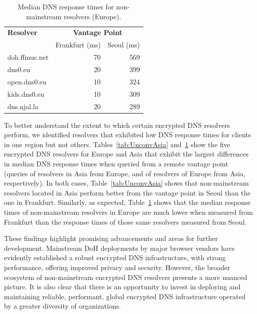 \begin{table}[t!]
\centering
\begin{tabular}{l|rr}
\toprule
\textbf{Resolver} & \multicolumn{2}{c}{\textbf{Vantage Point}} \\
                  & \textrm{Frankfurt (ms)}     & \textrm{Seoul (ms)} \\
\midrule
doh.ffmuc.net                               & 70 & 569                         \\
dns0.eu                        & 20 & 399                         \\
open.dns0.eu         & 10 & 324                         \\
kids.dns0.eu                                 & 10 & 309                         \\
dns.njal.la                        & 20 & 289                         \\
\bottomrule
\end{tabular}
    \caption{Median DNS response times for non-mainstream resolvers (Europe).}
\label{tab:UnconvEur}
\end{table}


To better understand the extent to which certain encrypted DNS resolvers
perform, we identified
resolvers that exhibited low DNS response times for clients in one region
but not others. 
Tables~\ref{tab:UnconvAsia} and~\ref{tab:UnconvEur} show 
the five encrypted DNS resolvers for Europe and Asia that exhibit the 
largest differences in median DNS response times when
queried from a remote vantage point (queries of resolvers in Asia from Europe,
and of resolvers of Europe from Asia, respectively). In both cases, 
Table~\ref{tab:UnconvAsia} shows that non-mainstream resolvers located
in Asia perform better from the vantage point in Seoul than the one in
Frankfurt.  Similarly, as expected, Table~\ref{tab:UnconvEur} shows that the
median response times of non-mainstream resolvers in Europe are much lower when
measured from Frankfurt than the response times of those same resolvers
measured from Seoul.

These findings highlight promising advancements and areas for further development. Mainstream DoH deployments by major browser vendors have evidently established a robust encrypted DNS infrastructure, with strong performance, offering improved privacy and security. However, the broader ecosystem of non-mainstream encrypted DNS resolvers presents a more nuanced picture. 
It is also clear that there is an opportunity
to invest in deploying and maintaining reliable, performant, global encrypted
DNS infrastructure operated by a greater diversity of organizations.
